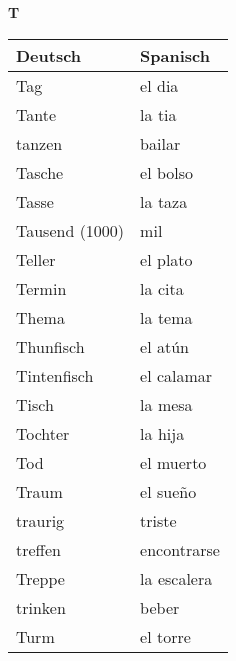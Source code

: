 \begin{flushright}\begin{Huge}\textbf{T}\end{Huge}\end{flushright}

\begin{longtable}{p{} p{}} 
\textbf{Deutsch}     & \textbf{Spanisch}                                       \\ \hline
\hline
\endhead %
Tag & el dia \\
Tante & la tia\\
tanzen & bailar\\
Tasche & el bolso\\
Tasse & la taza\\
Tausend (1000) & mil\\
Teller & el plato\\
Termin & la cita\\
Thema & la tema\\
Thunfisch & el atún\\
Tintenfisch & el calamar\\
Tisch & la mesa\\
Tochter & la hija\\
Tod & el muerto\\
Traum & el sueño\\
traurig & triste \\
treffen & encontrarse\\
Treppe & la escalera\\
trinken & beber\\
Turm & el torre\\

\end{longtable}
